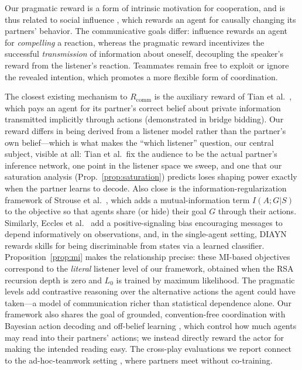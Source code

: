 \documentclass{article}
\newcommand{\Rcomm}{R_{\text{comm}}}
\begin{document}
Our pragmatic reward is a form of intrinsic motivation for cooperation, and is thus related to social influence \cite{jaques2019social}, which rewards an agent for causally changing its partners' behavior. The communicative goals differ: influence rewards an agent for \emph{compelling} a reaction, whereas the pragmatic reward incentivizes the successful \emph{transmission} of information about oneself, decoupling the speaker's reward from the listener's reaction. Teammates remain free to exploit or ignore the revealed intention, which promotes a more flexible form of coordination.

The closest existing mechanism to $\Rcomm$ is the auxiliary reward of Tian et al.~\cite{tian2020implicit}, which pays an agent for its partner's correct belief about private information transmitted implicitly through actions (demonstrated in bridge bidding). Our reward differs in being derived from a listener model rather than the partner's own belief---which is what makes the ``which listener'' question, our central subject, visible at all: Tian et al.\ fix the audience to be the actual partner's inference network, one point in the listener space we sweep, and one that our saturation analysis (Prop.~\ref{prop:saturation}) predicts loses shaping power exactly when the partner learns to decode. Also close is the information-regularization framework of Strouse et al.~\cite{strouse2018learning}, which adds a mutual-information term $I(A;G|S)$ to the objective so that agents share (or hide) their goal $G$ through their actions. Similarly, Eccles et al.~\cite{eccles2019biases} add a positive-signaling bias encouraging messages to depend informatively on observations, and, in the single-agent setting, DIAYN \cite{eysenbach2019diversity} rewards skills for being discriminable from states via a learned classifier. Proposition~\ref{prop:mi} makes the relationship precise: these MI-based objectives correspond to the \emph{literal} listener level of our framework, obtained when the RSA recursion depth is zero and $L_0$ is trained by maximum likelihood. The pragmatic levels add contrastive reasoning over the alternative actions the agent could have taken---a model of communication richer than statistical dependence alone. Our framework also shares the goal of grounded, convention-free coordination with Bayesian action decoding \cite{bard} and off-belief learning \cite{obl}, which control how much agents may read into their partners' actions; we instead directly reward the actor for making the intended reading easy. The cross-play evaluations we report connect to the ad-hoc-teamwork setting \cite{mirsky2022survey}, where partners meet without co-training.
\end{document}
